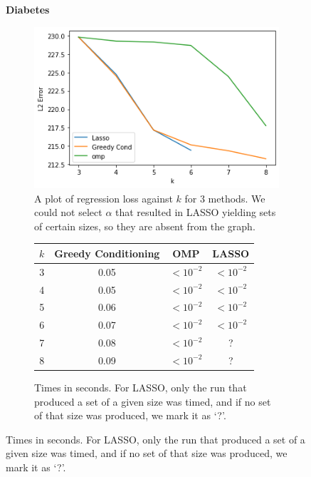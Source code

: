 \documentclass{amsart}
\theoremstyle{definition}
\begin{document}
\begin{figure}[H]
    \centering
    \textbf{Diabetes}\par\medskip
    \begin{subfigure}[b]{0.4\textwidth}
        \includegraphics[width=\textwidth]{diabetes.png}
        \caption{A plot of regression loss against $k$ for 3 methods. We could not select $\alpha$ that resulted in LASSO yielding sets of certain sizes, so they are absent from the graph.}
    \end{subfigure}
    \begin{subfigure}[b]{0.4\textwidth}
        \begin{tabular}{c c c c}
            $k$ & Greedy Conditioning & OMP & LASSO \\
            \hline
            3 & 0.05 & $<10^{-2}$ & $<10^{-2}$\\
            4 & 0.05 & $<10^{-2}$ & $<10^{-2}$\\
            5 & 0.06 & $<10^{-2}$ & $<10^{-2}$\\
            6 & 0.07& $<10^{-2}$ & $<10^{-2}$\\
            7 & 0.08 & $<10^{-2}$ & ?\\
            8 & 0.09 & $<10^{-2}$ & ?\\
            \hline
        \end{tabular}
        \vspace{0.5in}
        \caption{Times in seconds. For LASSO, only the run that produced a set of a given size was timed, and if no set of that size was produced, we mark it as `?'.}
    \end{subfigure}
\end{figure}
\end{document}
